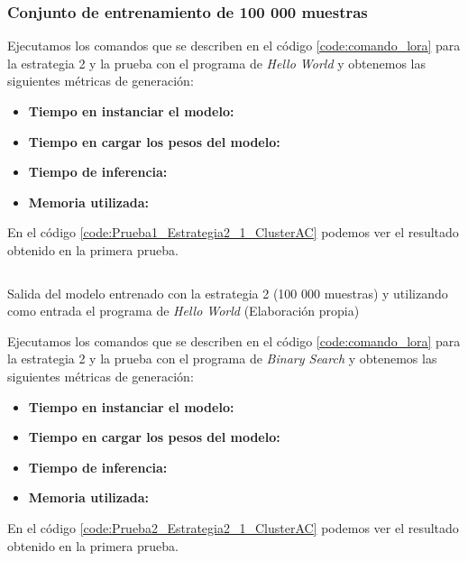 \subsubsection{Conjunto de entrenamiento de 100 000 muestras}

Ejecutamos los comandos que se describen en el código \ref{code:comando_lora} para
la estrategia 2 y la prueba con el programa de \textit{Hello World} y obtenemos
las siguientes métricas de generación:

\begin{itemize}
    \item \textbf{Tiempo en instanciar el modelo:}
    \item \textbf{Tiempo en cargar los pesos del modelo:}
    \item \textbf{Tiempo de inferencia:}
    \item \textbf{Memoria utilizada:}
\end{itemize}

En el código \ref{code:Prueba1_Estrategia2_1_ClusterAC} podemos ver el resultado obtenido
en la primera prueba.

\begin{mycode}
    \begin{verbatim}

    \end{verbatim}
    \caption[Salida del modelo entrenado con la estrategia 2 (100 000 muestras) y utilizando como entrada el programa de \textit{Hello World}]{Salida del modelo entrenado con la estrategia 2 (100 000 muestras) y utilizando como entrada el programa de \textit{Hello World} (Elaboración propia)}
    \label{code:Prueba1_Estrategia2_1_ClusterAC}
\end{mycode}

Ejecutamos los comandos que se describen en el código \ref{code:comando_lora} para
la estrategia 2 y la prueba con el programa de \textit{Binary Search} y obtenemos
las siguientes métricas de generación:

\begin{itemize}
    \item \textbf{Tiempo en instanciar el modelo:}
    \item \textbf{Tiempo en cargar los pesos del modelo:}
    \item \textbf{Tiempo de inferencia:}
    \item \textbf{Memoria utilizada:}
\end{itemize}

En el código \ref{code:Prueba2_Estrategia2_1_ClusterAC} podemos ver el resultado obtenido
en la primera prueba.

